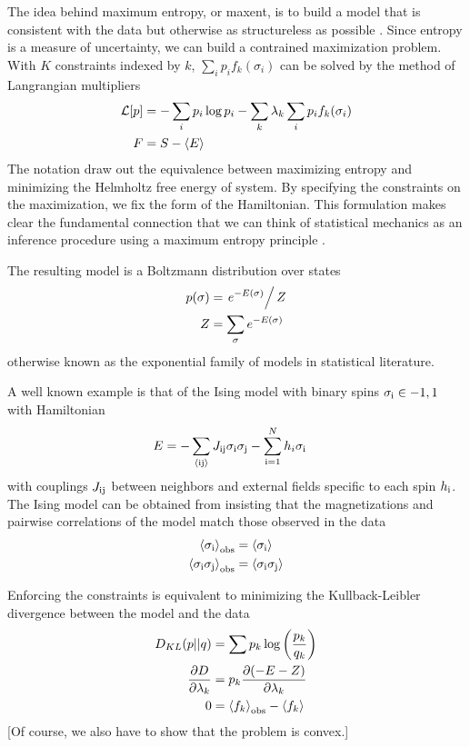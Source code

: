 \documentclass[aps,prl,twocolumn]{revtex4-1}
\begin{document}
The idea behind maximum entropy, or maxent, is to build a model that is consistent with the data but otherwise as structureless as possible \cite{Bretthorst:2003ua}.
Since entropy is a measure of uncertainty, we can build a contrained maximization problem. With $K$ constraints indexed by $k$, $\sum_i p_i f_k(\sigma_i)$ can be solved by the method of Langrangian multipliers
\begin{align}
	\mathcal{L}[p] &= -\sum_i p_i\log p_i - \sum_k \lambda_k \sum_i p_i f_k(\sigma_i)\\
	F &= S - \left<E\right>
\end{align}
The notation draw out the equivalence between maximizing entropy and minimizing the Helmholtz free energy of system. By specifying the constraints on the maximization, we fix the form of the Hamiltonian. This formulation makes clear the fundamental connection that we can think of statistical mechanics as an inference procedure using a maximum entropy principle \cite{Jaynes:1957fy}.

The resulting model is a Boltzmann distribution over states
\begin{align}
	p(\sigma) &= \left.e^{-E(\sigma)}\right/Z\\
	Z &= \sum_\sigma e^{-E(\sigma)}
\end{align}
otherwise known as the exponential family of models in statistical literature.

A well known example is that of the Ising model with binary spins $\sigma_{\rm i} \in {-1,1}$ with Hamiltonian 
\begin{align}
	E &= -\sum_{\left<\rm ij\right>} J_{\rm ij}\sigma_{\rm i}\sigma_{\rm j} -\sum_{\rm i=1}^N h_i\sigma_{\rm i}
\end{align}
with couplings $J_{\rm ij}$ between neighbors and external fields specific to each spin $h_{\rm i}$. The Ising model can be obtained from insisting that the magnetizations and pairwise correlations of the model match those observed in the data
\begin{align}
	\left<\sigma_{\rm i}\right>_{\rm obs} &= \left<\sigma_{\rm i}\right>\\
	\left<\sigma_{\rm i}\sigma_{\rm j}\right>_{\rm obs} &= \left<\sigma_{\rm i}\sigma_{\rm j}\right>
\end{align}

Enforcing the constraints is equivalent to minimizing the Kullback-Leibler divergence between the model and the data
\begin{align}
	D_{KL}(p||q) &= \sum p_k \log\left(\frac{p_k}{q_k}\right)\\
	\frac{\partial D}{\partial \lambda_k} &= p_k \frac{\partial (-E-Z)}{\partial \lambda_k}\\
	0 &= \left<f_k\right>_{\rm obs} -\left<f_k\right>
\end{align}
[Of course, we also have to show that the problem is convex.]
\end{document}
